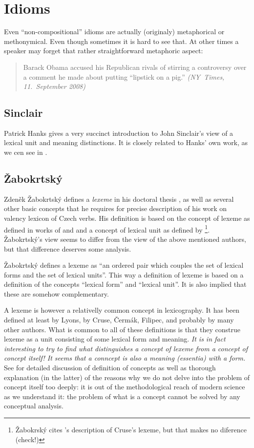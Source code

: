 
\chapter{Idioms}
Even ``non-compositional'' idioms are actually (originaly) metaphorical or methonymical.  Even though sometimes it is hard to see that. At other times a speaker may forget that rather straightforward metaphoric aspect:

\begin{quote}
Barack Obama accused his Republican rivals of stirring a controversy over a comment he made about putting “lipstick on a pig.” \emph{(NY~Times, 11.~September 2008)}
\end{quote}

\section{Sinclair}
Patrick Hanks gives a very succinct introduction to John Sinclair's \citep{sinclair:wiki} view of a lexical unit and meaning distinctions. It is closely related to Hanks' own work, as we cen see in \citet{hanks:norms}.

\section{Žabokrtský}
Zdeněk Žabokrtský defines a \emph{lexeme} in his doctoral thesis \citep{zabokrtsky:2005a}, as well as several other basic concepts that he requires for precise description of his work on valency lexicon of Czech verbs. His definition is based on the concept of lexeme as defined in works of \citet{cermak:91} and \citet{filipec:1994} and a concept of lexical unit as defined by \citet{cruse:1986}\footnote{Žabokrský cites \citealp{verspoor:1997}'s description of Cruse's lexeme, but that makes no diference {\xxx(check!)}}. Žabokrtský's view seems to differ from the view of the above mentioned authors, but that difference deserves some analysis.

Žabokrtský defines a lexeme as ``an ordered pair which couples the set of lexical forms and the set of lexical units''. This way a definition of lexeme is based on a definition of the concepts ``lexical form'' and ``lexical unit''. It is also implied that these are somehow complementary. 

A lexeme is however a relativelly common concept in lexicography. It has been defined at least by Lyons, by Cruse, Čermák, Filipec, and probably by many other authors. What is common to all of these definitions is that they construe lexeme as a unit consisting of some lexical form and meaning. 
\emph{It is in fact interesting to try to find what distinguishes a concept of lexeme from a concept of concept itself! It seems that a conncept is also a meaning (essentia) with a form.} See \citet{materna:1998,stranak:2001} for detailed discussion of definition of concepts as well as thorough explanation (in the latter) of the reasons why we do not delve into the problem of concept itself too deeply: it is out of the methodological reach of modern science as we understand it: the problem of what is a concept cannot be solved by any conceptual analysis.

